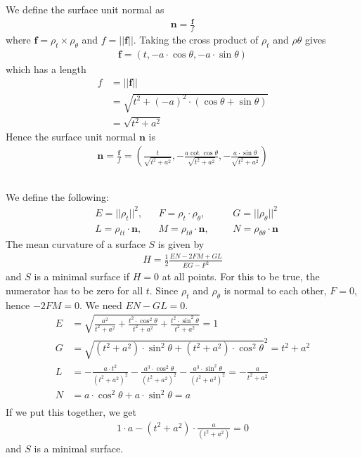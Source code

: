 \documentclass[a4paper,10pt,english]{article}
\begin{document}
We define the surface unit normal as
\begin{align*}
    \bm{n} = \frac{\bm{f}}{f}
\end{align*}
where $\bm{f} = \rho_t \times \rho_\theta$ and $f = ||\bm{f}||$. Taking the cross product of $\rho_t$ and $\rho\theta$ gives
\begin{align*}
    \bm{f} = 
        \left(
            t, 
            -a \cdot\cos\theta, 
            -a \cdot\sin\theta
        \right)
\end{align*}
which has a length
\begin{align*}
    f 
    &= ||\bm{f}|| \\
    &= \sqrt{
        t^2 + (-a)^2 \cdot (\cos\theta + \sin\theta)
    } \\
    &= \sqrt{
    t^2 + a^2
    }
\end{align*}
Hence the surface unit normal $\bm{n}$ is
\begin{align}
    \bm{n} 
    = \frac{\bm{f}}{f}
    = 
    \left(
        \frac{t}{\sqrt{t^2 + a^2}},
        - \frac{a \cot\cos\theta}{\sqrt{t^2 + a^2}},
        - \frac{a \cdot\sin\theta}{\sqrt{t^2 + a^2}}
    \right)
\end{align}

\subsection{}
We define the following:
\begin{align*}
    &E = ||\rho_t||^2,
    &&F = \rho_t\cdot\rho_\theta,
    &&&G = ||\rho_\theta||^2 \\
    &L = \rho_{tt}\cdot\bm{n},
    &&M = \rho_{t\theta}\cdot\bm{n},
    &&&N = \rho_{\theta\theta}\cdot\bm{n}
\end{align*}
The mean curvature of a surface $S$ is given by
\begin{align}
    H = \frac{1}{2} \frac{EN - 2FM + GL}{EG - F^2}
\end{align}
and $S$ is a minimal surface if $H=0$ at all points. For this to be true, the numerator has to be zero for all $t$. Since $\rho_t$ and $\rho_\theta$ is normal to each other, $F=0$, hence $-2FM=0$. We need $EN-GL=0$.
\begin{align*}
    E &= 
        \sqrt{
            \frac{a^2}{t^2+a^2} 
            + \frac{t^2 \cdot\cos^2\theta}{t^2+a^2}
            + \frac{t^2 \cdot\sin^2\theta}{t^2+a^2}
        }
        = 1 \\
    G &= 
        {\sqrt{
        (t^2+a^2)\cdot\sin^2\theta + (t^2+a^2)\cdot\cos^2\theta
        }}^2
        = t^2+a^2 \\
    L &=
        - \frac{a\cdot t^2}{(t^2+a^2)^2}
        - \frac{a^3\cdot\cos^2\theta}{(t^2+a^2)^2}
        - \frac{a^3\cdot\sin^2\theta}{(t^2+a^2)^2}
        = - \frac{a}{t^2+a^2} \\
    N &= 
        a\cdot\cos^2\theta + a\cdot\sin^2\theta 
        = a \\
\end{align*}
If we put this together, we get
\begin{align*}
    1\cdot a - (t^2+a^2) \cdot \frac{a}{(t^2+a^2)} = 0
\end{align*}
and $S$ is a minimal surface.
\end{document}
